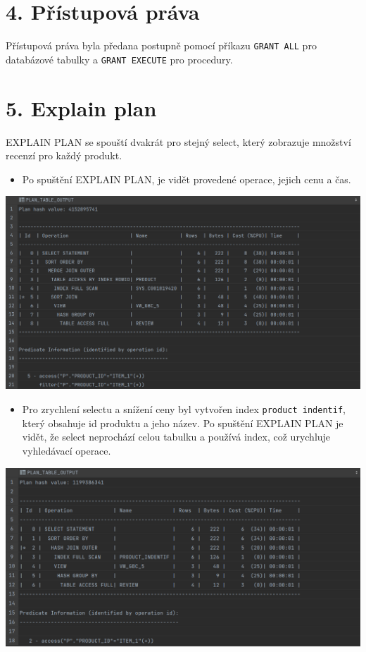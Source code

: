 \documentclass[12pt]{article}
\begin{document}
 \section*{4. Přístupová práva}
    Přístupová práva byla předana postupně pomocí příkazu \texttt{GRANT ALL} pro databázové \mbox{tabulky} a \texttt{GRANT EXECUTE} pro procedury.

\section*{5. Explain plan}
    EXPLAIN PLAN se spouští dvakrát pro stejný select, který zobrazuje množství recenzí pro každý produkt.
    \newpage
    \begin{itemize}
        \item Po spuštění EXPLAIN PLAN, je vidět provedené operace, jejich cenu a čas.
        \small
    \end{itemize}
        \begin{center}
            \includegraphics[scale=0.38]{7.png}
        \end{center}
    \begin{itemize}
        \item Pro zrychlení selectu a snížení ceny byl vytvořen index \texttt{product indentif}, který obsahuje id produktu a jeho název. Po spuštění EXPLAIN PLAN je vidět, že select neprochází celou tabulku a používá index, což urychluje vyhledávací operace.
    \end{itemize}
    \begin{center}
        \includegraphics[scale=0.405]{8.png}
    \end{center}
 
\end{document}
